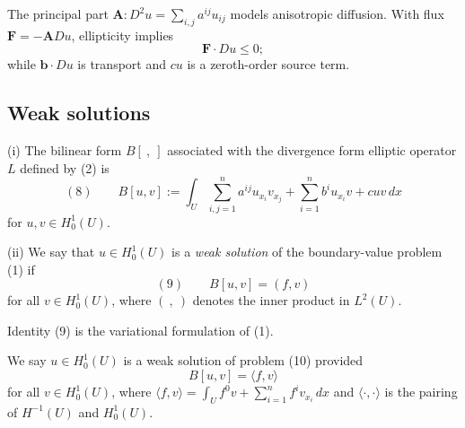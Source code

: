 \begin{remark}
\label{rem:elliptic-pde-physical-interpretation}

The principal part $\mathbf A:D^2u=\sum_{i,j}a^{ij}u_{ij}$ models anisotropic diffusion. With flux $\mathbf F=-\mathbf A Du$, ellipticity implies
$$\mathbf F \cdot Du \leq 0;$$
while $\mathbf b\cdot Du$ is transport and $cu$ is a zeroth-order source term.
\end{remark}

\subsection{Weak solutions}

\begin{definition}
\label{def:bilinear-form-weak-solution-l2}

(i) The bilinear form $B[\ ,\ ]$ associated with the divergence form elliptic operator $L$ defined by (2) is
$$(8) \qquad B[u,v] := \int_U \sum_{i,j=1}^n a^{ij}u_{x_i}v_{x_j} + \sum_{i=1}^n b^iu_{x_i}v + cuv \, dx$$
for $u,v \in H_0^1(U)$.

(ii) We say that $u \in H_0^1(U)$ is a \textit{weak solution} of the boundary-value problem (1) if
$$(9) \qquad B[u,v] = (f,v)$$
for all $v \in H_0^1(U)$, where $(\ ,\ )$ denotes the inner product in $L^2(U)$.
\end{definition}

\begin{remark}
\label{rem:variational-formulation}

Identity (9) is the variational formulation of (1).
\end{remark}

\begin{definition}
\label{def:weak-solution-elliptic-bvp}

We say $u \in H_0^1(U)$ is a weak solution of problem (10) provided
$$B[u,v] = \langle f,v \rangle$$
for all $v \in H_0^1(U)$, where $\langle f,v \rangle = \int_U f^0 v + \sum_{i=1}^n f^i v_{x_i} \, dx$ and $\langle \cdot,\cdot \rangle$ is the pairing of $H^{-1}(U)$ and $H_0^1(U)$.
\end{definition}

